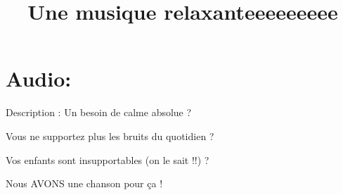 \documentclass[11pt,a4paper]{article}
\title{Une musique relaxanteeeeeeeee}
\begin{document}
\maketitle
\section*{Audio: }
\frame
{
}
Description : 
Un besoin de calme absolue ?

Vous ne supportez plus les bruits du quotidien ?

Vos enfants sont insupportables (on le sait !!) ?

Nous AVONS une chanson pour ça !
\end{document}
